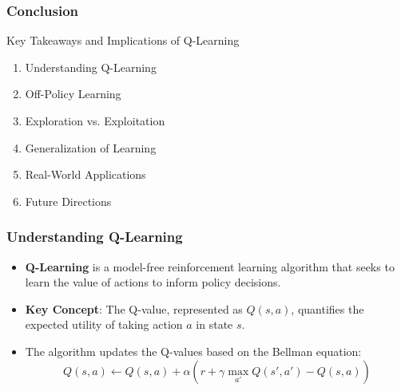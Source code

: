 \documentclass[aspectratio=169]{beamer}
\begin{document}
\begin{frame}
    \frametitle{Conclusion}
    \begin{block}{Key Takeaways and Implications of Q-Learning}
        \begin{enumerate}
            \item Understanding Q-Learning
            \item Off-Policy Learning
            \item Exploration vs. Exploitation
            \item Generalization of Learning
            \item Real-World Applications
            \item Future Directions
        \end{enumerate}
    \end{block}
\end{frame}

\begin{frame}[fragile]
    \frametitle{Understanding Q-Learning}
    \begin{itemize}
        \item \textbf{Q-Learning} is a model-free reinforcement learning algorithm that seeks to learn the value of actions to inform policy decisions.
        \item \textbf{Key Concept}: The Q-value, represented as \( Q(s, a) \), quantifies the expected utility of taking action \( a \) in state \( s \).
        \item The algorithm updates the Q-values based on the Bellman equation:
        \begin{equation}
            Q(s, a) \leftarrow Q(s, a) + \alpha \left( r + \gamma \max_{a'} Q(s', a') - Q(s, a) \right)
        \end{equation}
    \end{itemize}
\end{frame}
\end{document}
